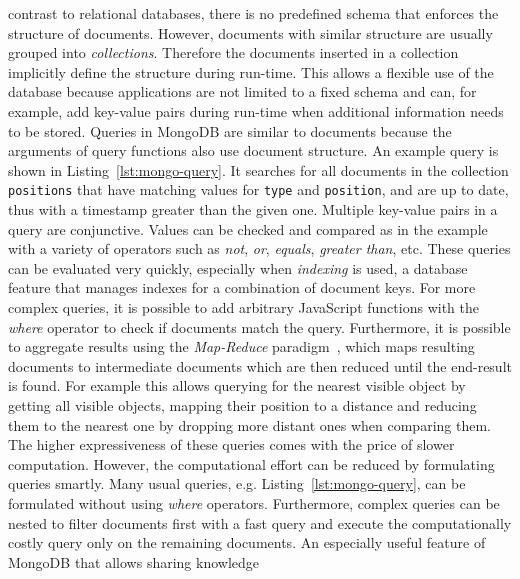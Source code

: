 \documentclass[a4paper,11pt]{article}
\newcommand{\reflst}[1]{Listing~\ref{#1}}
\begin{document}
contrast to relational databases, there is no predefined schema that
enforces the structure of documents. However, documents with similar
structure are usually grouped into \emph{collections}. Therefore the
documents inserted in a collection implicitly define the structure
during run-time. This allows a flexible use of the database because
applications are not limited to a fixed schema and can, for example,
add key-value pairs during run-time when additional information needs
to be stored.
Queries in MongoDB are similar to documents because the arguments of
query functions also use document structure. An example query is
shown in \reflst{lst:mongo-query}. It searches for all documents in
the collection \texttt{positions}
that have matching values for \texttt{type} and \texttt{position}, and
are up to date, thus with a timestamp greater than the given
one. Multiple key-value pairs in a query are conjunctive.  Values can
be checked and compared as in the example with a variety of operators
such as \textit{not}, \textit{or}, \textit{equals}, \textit{greater
  than}, etc. These queries can be evaluated very quickly, especially
when \emph{indexing} is used, a database feature that manages indexes
for a combination of document keys. For more complex queries, it is
possible to add arbitrary JavaScript functions with the \textit{where}
operator to check if documents match the query. Furthermore, it is
possible to aggregate results using the \emph{Map-Reduce}
paradigm~\cite{mapreduce}, which maps resulting documents to
intermediate documents which are then reduced until the end-result is
found. For example this allows querying for the nearest visible object
by getting all visible objects, mapping their position to a distance
and reducing them to the nearest one by dropping more distant ones
when comparing them.  The higher expressiveness of these queries comes
with the price of slower computation. However, the computational
effort can be reduced by formulating queries smartly. Many usual
queries, e.g. \reflst{lst:mongo-query}, can be formulated without
using \textit{where} operators. Furthermore, complex queries can be
nested to filter documents first with a fast query and execute the
computationally costly query only on the remaining documents.
%
An especially useful feature of MongoDB that allows sharing knowledge
\end{document}
